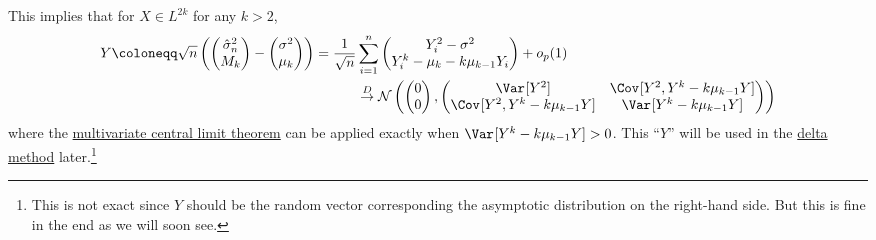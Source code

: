 This implies that for \(X \in L^{2k}\) for any \(k > 2\),
\[
	\begin{split}
		Y \coloneqq \sqrt{n} \left( \begin{pmatrix}
				                            \hat{\sigma} _n^2 \\
				                            M_k               \\
			                            \end{pmatrix} - \begin{pmatrix}
				                                            \sigma ^2 \\
				                                            \mu _k    \\
			                                            \end{pmatrix} \right)
		= \frac{1}{\sqrt{n} } & \sum_{i=1}^{n}  \begin{pmatrix}
			                                        Y_i^2 - \sigma ^2                 \\
			                                        Y_i^k - \mu _k - k \mu _{k-1} Y_i \\
		                                        \end{pmatrix} + o_p(1)                                                                                                     \\
		                      & \overset{D}{\to} \mathcal{N} \left( \begin{pmatrix}
				                                                            0 \\
				                                                            0 \\
			                                                            \end{pmatrix} , \begin{pmatrix}
				                                                                            \Var_{}[Y^2]                        & \Cov_{}[Y^2 , Y^k - k \mu _{k-1} Y] \\
				                                                                            \Cov_{}[Y^2 , Y^k - k \mu _{k-1} Y] & \Var_{}[Y^k - k \mu _{k-1} Y]       \\
			                                                                            \end{pmatrix} \right)
	\end{split}
\]
where the \hyperref[thm:multivariate-CLT]{multivariate central limit theorem} can be applied exactly when \(\Var_{}[Y^k - k \mu _{k-1} Y] > 0\). This ``\(Y\)'' will be used in the \hyperref[thm:delta-method]{delta method} later.\footnote{This is not exact since \(Y\) should be the random vector corresponding the asymptotic distribution on the right-hand side. But this is fine in the end as we will soon see.}

